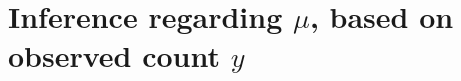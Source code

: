 \documentclass[10pt,handout]{beamer}\usepackage[]{graphicx}\usepackage[]{color}
\begin{document}

\section{Inference regarding $\mu$, based on observed count $y$}
\end{document}
